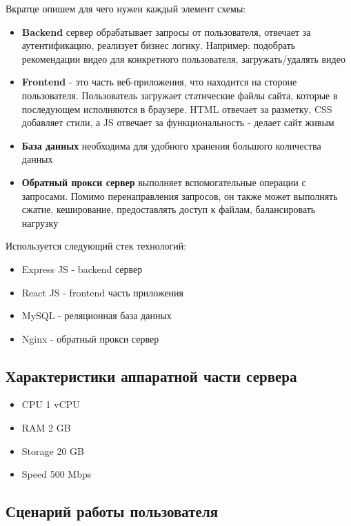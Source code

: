 \documentclass[12pt]{article}
\begin{document}
Вкратце опишем для чего нужен каждый элемент схемы:

\begin{itemize}
    \item \textbf{Backend} сервер обрабатывает запросы от пользователя, отвечает за аутентификацию,
          реализует бизнес логику. Например: подобрать рекомендации видео для конкретного пользователя, загружать/удалять видео
    \item \textbf{Frontend} - это часть веб-приложения, что находится на стороне пользователя.
          Пользователь загружает статические файлы сайта, которые в последующем исполняются в браузере.
          HTML отвечает за разметку, CSS добавляет стили, а JS отвечает за функциональность - делает сайт живым
    \item \textbf{База данных} необходима для удобного хранения большого количества данных
    \item \textbf{Обратный прокси сервер} выполняет вспомогательные операции с запросами.
          Помимо перенаправления запросов, он также может выполнять сжатие, кеширование, предоставлять доступ к файлам,
          балансировать нагрузку
\end{itemize}

Используется следующий стек технологий:

\begin{itemize}
    \item Express JS - backend сервер
    \item React JS - frontend часть приложения
    \item MySQL - реляционная база данных
    \item Nginx - обратный прокси сервер
\end{itemize}

\subsection{Характеристики аппаратной части сервера}

\begin{itemize}
    \item CPU 1 vCPU
    \item RAM 2 GB
    \item Storage 20 GB
    \item Speed 500 Mbps
\end{itemize}

\subsection{Сценарий работы пользователя}
\end{document}
